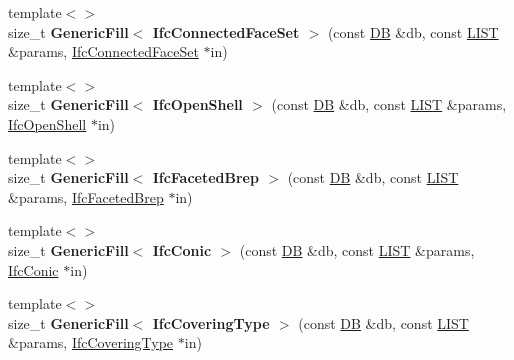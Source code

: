 \begin{DoxyCompactItemize}
\item 
\hypertarget{namespace_assimp_1_1_s_t_e_p_a53f40bedf18b0087e93145bd62f5f92d}{{\footnotesize template$<$$>$ }\\size\+\_\+t {\bfseries Generic\+Fill$<$ Ifc\+Connected\+Face\+Set $>$} (const \hyperlink{class_assimp_1_1_s_t_e_p_1_1_d_b}{D\+B} \&db, const \hyperlink{class_assimp_1_1_s_t_e_p_1_1_e_x_p_r_e_s_s_1_1_l_i_s_t}{L\+I\+S\+T} \&params, \hyperlink{struct_assimp_1_1_i_f_c_1_1_ifc_connected_face_set}{Ifc\+Connected\+Face\+Set} $\ast$in)}\label{namespace_assimp_1_1_s_t_e_p_a53f40bedf18b0087e93145bd62f5f92d}

\item 
\hypertarget{namespace_assimp_1_1_s_t_e_p_a569b54719ea800130dfa01791dfd0791}{{\footnotesize template$<$$>$ }\\size\+\_\+t {\bfseries Generic\+Fill$<$ Ifc\+Open\+Shell $>$} (const \hyperlink{class_assimp_1_1_s_t_e_p_1_1_d_b}{D\+B} \&db, const \hyperlink{class_assimp_1_1_s_t_e_p_1_1_e_x_p_r_e_s_s_1_1_l_i_s_t}{L\+I\+S\+T} \&params, \hyperlink{struct_assimp_1_1_i_f_c_1_1_ifc_open_shell}{Ifc\+Open\+Shell} $\ast$in)}\label{namespace_assimp_1_1_s_t_e_p_a569b54719ea800130dfa01791dfd0791}

\item 
\hypertarget{namespace_assimp_1_1_s_t_e_p_a23b907fae51fd28294bad83b19820233}{{\footnotesize template$<$$>$ }\\size\+\_\+t {\bfseries Generic\+Fill$<$ Ifc\+Faceted\+Brep $>$} (const \hyperlink{class_assimp_1_1_s_t_e_p_1_1_d_b}{D\+B} \&db, const \hyperlink{class_assimp_1_1_s_t_e_p_1_1_e_x_p_r_e_s_s_1_1_l_i_s_t}{L\+I\+S\+T} \&params, \hyperlink{struct_assimp_1_1_i_f_c_1_1_ifc_faceted_brep}{Ifc\+Faceted\+Brep} $\ast$in)}\label{namespace_assimp_1_1_s_t_e_p_a23b907fae51fd28294bad83b19820233}

\item 
\hypertarget{namespace_assimp_1_1_s_t_e_p_af697cf4aa27e5751584bdaa3a90c68c1}{{\footnotesize template$<$$>$ }\\size\+\_\+t {\bfseries Generic\+Fill$<$ Ifc\+Conic $>$} (const \hyperlink{class_assimp_1_1_s_t_e_p_1_1_d_b}{D\+B} \&db, const \hyperlink{class_assimp_1_1_s_t_e_p_1_1_e_x_p_r_e_s_s_1_1_l_i_s_t}{L\+I\+S\+T} \&params, \hyperlink{struct_assimp_1_1_i_f_c_1_1_ifc_conic}{Ifc\+Conic} $\ast$in)}\label{namespace_assimp_1_1_s_t_e_p_af697cf4aa27e5751584bdaa3a90c68c1}

\item 
\hypertarget{namespace_assimp_1_1_s_t_e_p_ad6c04be6087a3c099130790789b11f7f}{{\footnotesize template$<$$>$ }\\size\+\_\+t {\bfseries Generic\+Fill$<$ Ifc\+Covering\+Type $>$} (const \hyperlink{class_assimp_1_1_s_t_e_p_1_1_d_b}{D\+B} \&db, const \hyperlink{class_assimp_1_1_s_t_e_p_1_1_e_x_p_r_e_s_s_1_1_l_i_s_t}{L\+I\+S\+T} \&params, \hyperlink{struct_assimp_1_1_i_f_c_1_1_ifc_covering_type}{Ifc\+Covering\+Type} $\ast$in)}\label{namespace_assimp_1_1_s_t_e_p_ad6c04be6087a3c099130790789b11f7f}


\end{DoxyCompactItemize}

